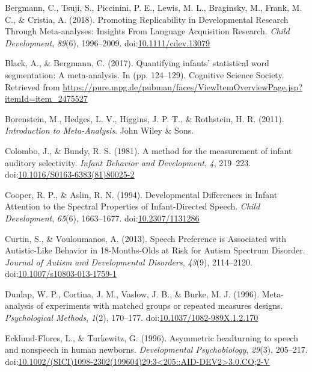 \documentclass[man]{apa6}
\begin{document}
\hypertarget{ref-bergmann_promoting_2018}{}
Bergmann, C., Tsuji, S., Piccinini, P. E., Lewis, M. L., Braginsky, M.,
Frank, M. C., \& Cristia, A. (2018). Promoting Replicability in
Developmental Research Through Meta-analyses: Insights From Language
Acquisition Research. \emph{Child Development}, \emph{89}(6),
1996--2009.
doi:\href{https://doi.org/10.1111/cdev.13079}{10.1111/cdev.13079}

\hypertarget{ref-black_quantifying_2017}{}
Black, A., \& Bergmann, C. (2017). Quantifying infants' statistical word
segmentation: A meta-analysis. In (pp. 124--129). Cognitive Science
Society. Retrieved from
\url{https://pure.mpg.de/pubman/faces/ViewItemOverviewPage.jsp?itemId=item_2475527}

\hypertarget{ref-borenstein_introduction_2011}{}
Borenstein, M., Hedges, L. V., Higgins, J. P. T., \& Rothstein, H. R.
(2011). \emph{Introduction to Meta-Analysis}. John Wiley \& Sons.

\hypertarget{ref-colombo_method_1981}{}
Colombo, J., \& Bundy, R. S. (1981). A method for the measurement of
infant auditory selectivity. \emph{Infant Behavior and Development},
\emph{4}, 219--223.
doi:\href{https://doi.org/10.1016/S0163-6383(81)80025-2}{10.1016/S0163-6383(81)80025-2}

\hypertarget{ref-cooper_developmental_1994}{}
Cooper, R. P., \& Aslin, R. N. (1994). Developmental Differences in
Infant Attention to the Spectral Properties of Infant-Directed Speech.
\emph{Child Development}, \emph{65}(6), 1663--1677.
doi:\href{https://doi.org/10.2307/1131286}{10.2307/1131286}

\hypertarget{ref-curtin_speech_2013}{}
Curtin, S., \& Vouloumanos, A. (2013). Speech Preference is Associated
with Autistic-Like Behavior in 18-Months-Olds at Risk for Autism
Spectrum Disorder. \emph{Journal of Autism and Developmental Disorders},
\emph{43}(9), 2114--2120.
doi:\href{https://doi.org/10.1007/s10803-013-1759-1}{10.1007/s10803-013-1759-1}

\hypertarget{ref-dunlap_meta-analysis_1996}{}
Dunlap, W. P., Cortina, J. M., Vaslow, J. B., \& Burke, M. J. (1996).
Meta-analysis of experiments with matched groups or repeated measures
designs. \emph{Psychological Methods}, \emph{1}(2), 170--177.
doi:\href{https://doi.org/10.1037/1082-989X.1.2.170}{10.1037/1082-989X.1.2.170}

\hypertarget{ref-ecklund-flores_asymmetric_1996}{}
Ecklund-Flores, L., \& Turkewitz, G. (1996). Asymmetric headturning to
speech and nonspeech in human newborns. \emph{Developmental
Psychobiology}, \emph{29}(3), 205--217.
doi:\href{https://doi.org/10.1002/(SICI)1098-2302(199604)29:3\%3C205::AID-DEV2\%3E3.0.CO;2-V}{10.1002/(SICI)1098-2302(199604)29:3\textless{}205::AID-DEV2\textgreater{}3.0.CO;2-V}
\end{document}
